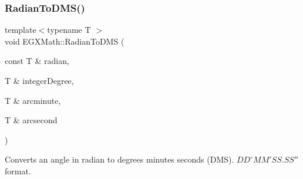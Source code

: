 \subsubsection{\texorpdfstring{Radian\+To\+D\+M\+S()}{RadianToDMS()}}
{\footnotesize\ttfamily template$<$typename T $>$ \\
void E\+G\+X\+Math\+::\+Radian\+To\+D\+MS (\begin{DoxyParamCaption}\item[{const T \&}]{radian,  }\item[{T \&}]{integer\+Degree,  }\item[{T \&}]{arcminute,  }\item[{T \&}]{arcsecond }\end{DoxyParamCaption})}



Converts an angle in radian to degrees minutes seconds (D\+MS). ${DD}^{\circ}{MM}'{SS.SS}''$ format. 



